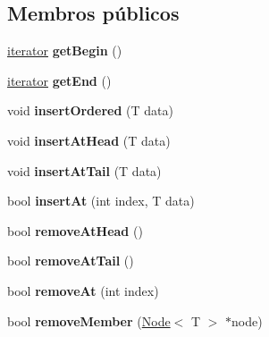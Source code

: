 \subsection*{Membros públicos}
\begin{DoxyCompactItemize}
\item 
\hyperlink{classIterator}{iterator} {\bfseries get\+Begin} ()\hypertarget{classList_a68622249171196c75282df155f7b84e9}{}\label{classList_a68622249171196c75282df155f7b84e9}

\item 
\hyperlink{classIterator}{iterator} {\bfseries get\+End} ()\hypertarget{classList_a135373c338e5e237d16d050cef9ddeb1}{}\label{classList_a135373c338e5e237d16d050cef9ddeb1}

\item 
void {\bfseries insert\+Ordered} (T data)\hypertarget{classList_a3c86c8a01536564c77af1f4ba6a10297}{}\label{classList_a3c86c8a01536564c77af1f4ba6a10297}

\item 
void {\bfseries insert\+At\+Head} (T data)\hypertarget{classList_a49097a3526c66422eddb5b43ee544237}{}\label{classList_a49097a3526c66422eddb5b43ee544237}

\item 
void {\bfseries insert\+At\+Tail} (T data)\hypertarget{classList_a0797712b34c3ddc19a002ee5cb73cf7a}{}\label{classList_a0797712b34c3ddc19a002ee5cb73cf7a}

\item 
bool {\bfseries insert\+At} (int index, T data)\hypertarget{classList_ad9fcc91ae96748dd9a483fb955f12a16}{}\label{classList_ad9fcc91ae96748dd9a483fb955f12a16}

\item 
bool {\bfseries remove\+At\+Head} ()\hypertarget{classList_a7801ffc354ee7f75981d116624ebf1d1}{}\label{classList_a7801ffc354ee7f75981d116624ebf1d1}

\item 
bool {\bfseries remove\+At\+Tail} ()\hypertarget{classList_ad8081f70cd0e8d3dd83755aa0831be07}{}\label{classList_ad8081f70cd0e8d3dd83755aa0831be07}

\item 
bool {\bfseries remove\+At} (int index)\hypertarget{classList_a5952c455c1fb82d39b02d4ec6465a175}{}\label{classList_a5952c455c1fb82d39b02d4ec6465a175}

\item 
bool {\bfseries remove\+Member} (\hyperlink{classNode}{Node}$<$ T $>$ $\ast$node)\hypertarget{classList_a82dc39ea3a362cc53cbbae72155b6a81}{}\label{classList_a82dc39ea3a362cc53cbbae72155b6a81}


\end{DoxyCompactItemize}
